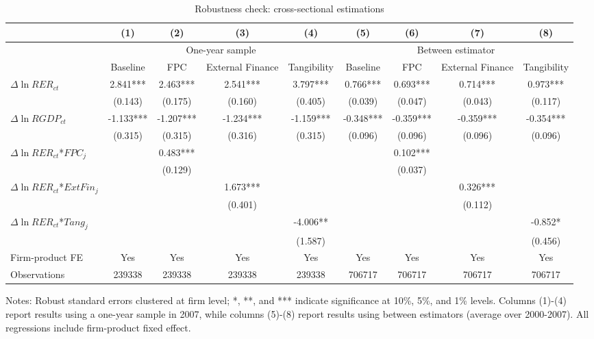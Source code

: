 \begin{table}
	\centering
	\caption{Robustness check: cross-sectional estimations}
	\begin{threeparttable}
		\begin{tabular}{lcccccccc}
			\toprule
			& (1)   & (2)   & (3)   & (4) &  (5)  &  (6)  & (7)  & (8)\\
			\midrule
			& \multicolumn{4}{c}{One-year sample} & \multicolumn{4}{c}{Between estimator}\\
			& Baseline & FPC   & External Finance & Tangibility & Baseline & FPC & External Finance & Tangibility\\
			\midrule
			$\Delta \ln RER_{ct}$ & 2.841*** & 2.463*** & 2.541*** & 3.797*** & 0.766*** & 0.693*** & 0.714*** & 0.973*** \\
			& (0.143) & (0.175) & (0.160) & (0.405) & (0.039) & (0.047) & (0.043) & (0.117) \\
			$\Delta \ln RGDP_{ct}$ & -1.133*** & -1.207*** & -1.234*** & -1.159*** & -0.348*** & -0.359*** & -0.359*** & -0.354*** \\
			& (0.315) & (0.315) & (0.316) & (0.315) & (0.096) & (0.096) & (0.096) & (0.096) \\
			$\Delta \ln RER_{ct}$*$FPC_{j}$ &   & 0.483*** &       &       &       & 0.102*** &       &  \\
			&   & (0.129) &       &       &       & (0.037) &       &  \\
			$\Delta \ln RER_{ct}$*$ExtFin_{j}$ &   &       & 1.673*** &       &       &       & 0.326*** &  \\
			&  &       & (0.401) &       &       &       & (0.112) &  \\
			$\Delta \ln RER_{ct}$*$Tang_{j}$ &   &       &       & -4.006** &       &       &       & -0.852* \\
			&   &       &       & (1.587) &       &       &       & (0.456) \\
			Firm-product FE &  Yes   & Yes   & Yes   & Yes &Yes   & Yes   & Yes   & Yes\\
			Observations & 239338 & 239338 & 239338 & 239338 & 706717 & 706717 & 706717 & 706717 \\
			\bottomrule
		\end{tabular}
		\begin{tablenotes}
			\footnotesize
			\item Notes: Robust standard errors clustered at firm level; *, **, and *** indicate significance at 10\%, 5\%, and 1\% levels. Columns (1)-(4) report results using a one-year sample in 2007, while columns (5)-(8) report results using between estimators (average over 2000-2007). All regressions include firm-product fixed effect.
		\end{tablenotes}
	\end{threeparttable}
	\label{tab.robust.crosec}
\end{table}

